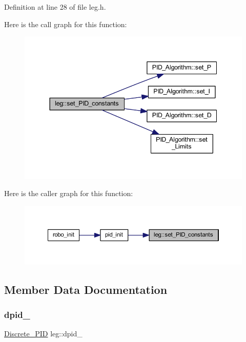 Definition at line 28 of file leg.\+h.

Here is the call graph for this function\+:
\nopagebreak
\begin{figure}[H]
\begin{center}
\leavevmode
\includegraphics[width=344pt]{classleg_ad783f2af37d09757d3c997f081d12aaf_cgraph}
\end{center}
\end{figure}
Here is the caller graph for this function\+:
\nopagebreak
\begin{figure}[H]
\begin{center}
\leavevmode
\includegraphics[width=350pt]{classleg_ad783f2af37d09757d3c997f081d12aaf_icgraph}
\end{center}
\end{figure}


\subsection{Member Data Documentation}
\mbox{\label{classleg_a8899cef4707a42110cc1fc32b3ea8a6b}} 
\subsubsection{\texorpdfstring{dpid\_}{dpid\_}}
{\footnotesize\ttfamily \mbox{\hyperlink{class_discrete___p_i_d}{Discrete\+\_\+\+P\+ID}} leg\+::dpid\+\_\+\hspace{0.3cm}{\ttfamily [private]}}




